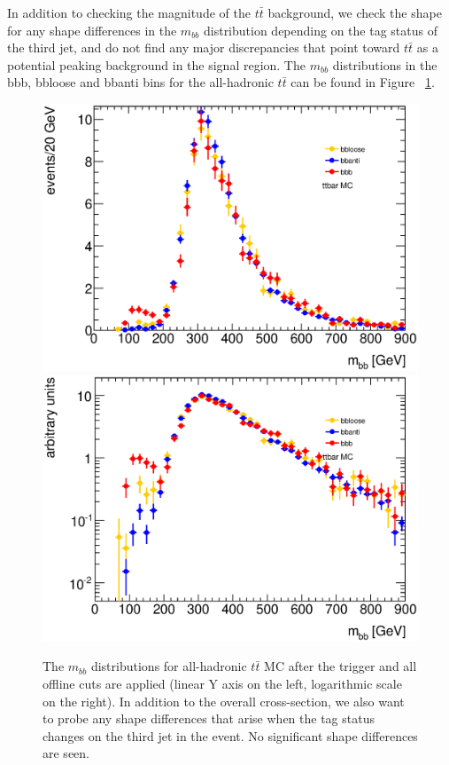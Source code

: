 In addition to checking the magnitude of the $t\bar{t}$ background, we check the shape
for any shape differences in the $m_{bb}$ distribution depending on the tag status of the
third jet, and do not find any major discrepancies that point toward $t\bar{t}$ as a
potential peaking background in the signal region. The $m_{bb}$ distributions in the
bbb, bbloose and bbanti bins for the all-hadronic $t\bar{t}$ can be found in Figure
~\ref{fig:ttbar_mbb}.




\begin{figure}[hbt]
\includegraphics[width=0.45\linewidth]{BackgroundEstimation/images/mbb_compare_bbb_bbloose_bbanti_ttbar.eps}
\includegraphics[width=0.45\linewidth]{BackgroundEstimation/images/mbb_compare_bbb_bbloose_bbanti_ttbar_logy.eps}
\caption{The $m_{bb}$ distributions for all-hadronic $t\bar{t}$ MC after the trigger and all offline cuts are applied (linear Y axis on the left, logarithmic scale on the right).  In addition to the overall cross-section, we also want to probe any shape differences that arise when the tag status changes on the third jet in the event.  No significant shape differences are seen.}
\label{fig:ttbar_mbb}
\end{figure}







%
%




